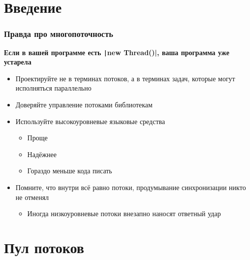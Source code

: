 \documentclass{../../slides-style}
\begin{document}
    \begin{frame}[plain]
        \titlepage
    \end{frame}

    \section{Введение}

    \begin{frame}
        \frametitle{Правда про многопоточность}
        \textbf{Если в вашей программе есть \texttt|new Thread()|, ваша программа уже устарела}
        \begin{itemize}
            \item Проектируйте не в терминах потоков, а в терминах задач, которые могут исполняться параллельно
            \item Доверяйте управление потоками библиотекам
            \item Используйте высокоуровневые языковые средства
            \begin{itemize}
                \item Проще
                \item Надёжнее
                \item Гораздо меньше кода писать
            \end{itemize}
            \item Помните, что внутри всё равно потоки, продумывание синхронизации никто не отменял
            \begin{itemize}
                \item Иногда низкоуровневые потоки внезапно наносят ответный удар
            \end{itemize}
        \end{itemize}
    \end{frame}

    \section{Пул потоков}
\end{document}
